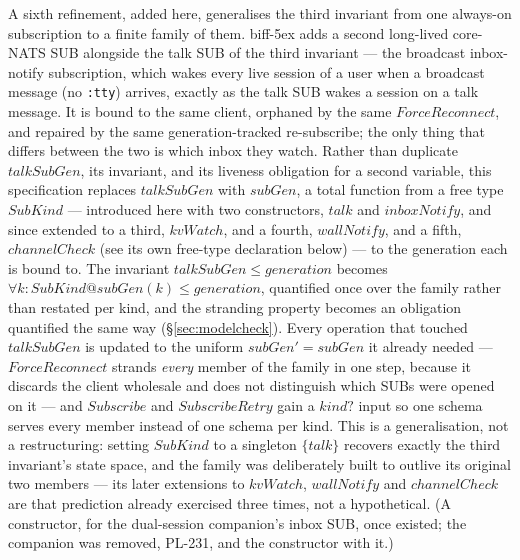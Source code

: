 \documentclass[a4paper,10pt,fleqn]{article}
\begin{document}
A sixth refinement, added here, generalises the third invariant from one
always-on subscription to a finite family of them.  biff-5ex adds a second
long-lived core-NATS SUB alongside the talk SUB of the third
invariant --- the broadcast inbox-notify subscription, which wakes every
live session of a user when a broadcast message (no \texttt{:tty}) arrives,
exactly as the talk SUB wakes a session on a talk message.  It is bound to
the same client, orphaned by the same $ForceReconnect$, and repaired by the
same generation-tracked re-subscribe; the only thing that differs between
the two is which inbox they watch.  Rather than duplicate $talkSubGen$,
its invariant, and its liveness obligation for a second variable, this
specification replaces $talkSubGen$ with $subGen$, a total function from a
free type $SubKind$ --- introduced here with two constructors, $talk$ and
$inboxNotify$, and since extended to a third, $kvWatch$, and a fourth,
$wallNotify$, and a fifth, $channelCheck$ (see its own free-type declaration below) --- to the generation each is bound to.  The
invariant $talkSubGen \leq generation$ becomes $\forall k : SubKind @
subGen(k) \leq generation$, quantified once over the family rather than
restated per kind, and the stranding property becomes an obligation
quantified the same way (\S\ref{sec:modelcheck}).  Every operation that
touched $talkSubGen$ is updated to the uniform $subGen' = subGen$ it
already needed --- $ForceReconnect$ strands \emph{every} member of the
family in one step, because it discards the client wholesale and does not
distinguish which SUBs were opened on it --- and $Subscribe$ and
$SubscribeRetry$ gain a $kind?$ input so one schema serves every member
instead of one schema per kind.  This is a generalisation, not a
restructuring: setting $SubKind$ to a singleton $\{ talk \}$ recovers
exactly the third invariant's state space, and the family was
deliberately built to outlive its original two members --- its later
extensions to $kvWatch$, $wallNotify$ and $channelCheck$ are that prediction already
exercised three times, not a hypothetical.  (A constructor, for the dual-session
companion's inbox SUB, once existed; the companion was removed, PL-231,
and the constructor with it.)
\end{document}
